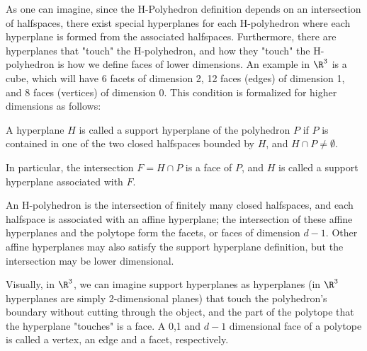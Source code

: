 \documentclass{TC}
\begin{document}
As one can imagine, since the H-Polyhedron definition depends on an intersection of halfspaces, there exist special hyperplanes for each H-polyhedron where each hyperplane is formed from the associated halfspaces. Furthermore, there are hyperplanes that "touch" the H-polyhedron, and how they "touch" the H-polyhedron is how we define faces of lower dimensions. An example in $\R^3$ is a cube, which will have 6 facets of dimension 2, 12 faces (edges) of dimension 1, and 8 faces (vertices) of dimension 0. This condition is formalized for higher dimensions as follows: 


\begin{definition}
A hyperplane $H$ is called a support hyperplane of the polyhedron $P$ if $P$ is contained in one of the two closed halfspaces bounded by $H$, and $H \cap P \neq \emptyset$. 

In particular, the intersection $F= H \cap P$ is a face of $P$, and $H$ is called a support hyperplane associated with $F$. 
\end{definition}

An H-polyhedron is the intersection of finitely many closed halfspaces, and each halfspace is associated with an affine hyperplane; the intersection of these affine hyperplanes and the polytope form the facets, or faces of dimension $d-1$. Other affine hyperplanes may also satisfy the support hyperplane definition, but the intersection may be lower dimensional.

Visually, in $\R^3$, we can imagine support hyperplanes as hyperplanes (in $\R^3$ hyperplanes are simply 2-dimensional planes) that touch the polyhedron's boundary without cutting through the object, and the part of the polytope that the hyperplane "touches" is a face. A 0,1 and $d-1$ dimensional face of a polytope is called a vertex, an edge and a facet, respectively.
\end{document}
